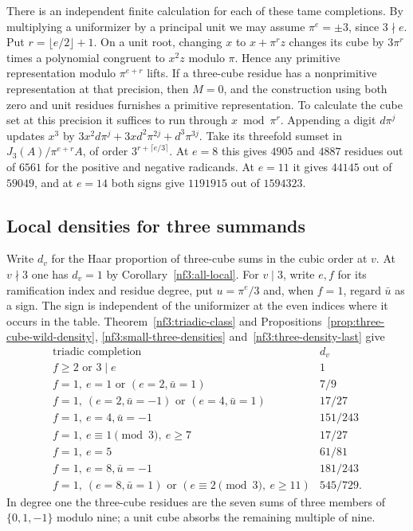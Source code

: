 \documentclass[11pt,letterpaper]{article}
\theoremstyle{definition}
\numberwithin{equation}{section}
\begin{document}
There is an independent finite calculation for each of these tame
completions. By multiplying a uniformizer by a principal unit we
may assume $\pi^e=\pm3$, since $3\nmid e$. Put
$r=\lfloor e/2\rfloor+1$. On a unit root, changing $x$ to
$x+\pi^r z$ changes its cube by $3\pi^r$ times a polynomial
congruent to $x^2 z$ modulo $\pi$. Hence any primitive representation
modulo $\pi^{e+r}$ lifts. If a three-cube residue has a nonprimitive representation at that
precision, then $M=0$, and the construction using both zero and unit
residues furnishes a primitive representation. To calculate the cube set at this
precision it suffices to run through $x\bmod\pi^r$. Appending a
digit $d\pi^j$ updates $x^3$ by
$3x^2d\pi^j+3x d^2\pi^{2j}+d^3\pi^{3j}$. Take its threefold
sumset in $J_3(A)/\pi^{e+r}A$, of order
$3^{r+\lceil e/3\rceil}$. At $e=8$ this gives $4905$ and $4887$
residues out of $6561$ for the positive and negative radicands.
At $e=11$ it gives $44145$ out of $59049$, and at $e=14$ both
signs give $1191915$ out of $1594323$.

\subsection{Local densities for three summands}
\label{sec:local-three-table}
Write $d_v$ for the Haar proportion of three-cube sums in the cubic
order at $v$. At $v\nmid3$ one has $d_v=1$ by
Corollary~\ref{nf3:all-local}. For $v\mid3$, write $e,f$ for its
ramification index and residue degree, put $u=\pi^e/3$ and, when
$f=1$, regard $\bar u$ as a sign. The sign is independent of the
uniformizer at the even indices where it occurs in the table.
Theorem~\ref{nf3:triadic-class} and
Propositions~\ref{prop:three-cube-wild-density},
\ref{nf3:small-three-densities} and~\ref{nf3:three-density-last} give
\[
\begin{array}{c|c}
 \text{triadic completion}&d_v\\\hline
 f\ge2\text{ or }3\mid e&1\\
 f=1,\ e=1\text{ or }(e=2,\bar u=1)&7/9\\
 f=1,\ (e=2,\bar u=-1)\text{ or }(e=4,\bar u=1)&17/27\\
 f=1,\ e=4,\bar u=-1&151/243\\
 f=1,\ e\equiv1\pmod3,\ e\ge7&17/27\\
 f=1,\ e=5&61/81\\
 f=1,\ e=8,\bar u=-1&181/243\\
 f=1,\ (e=8,\bar u=1)\text{ or }(e\equiv2\pmod3,\ e\ge11)&545/729 .
\end{array}
\]
In degree one the three-cube residues are the seven sums of three
members of $\{0,1,-1\}$ modulo nine; a unit cube absorbs the
remaining multiple of nine.
\end{document}
